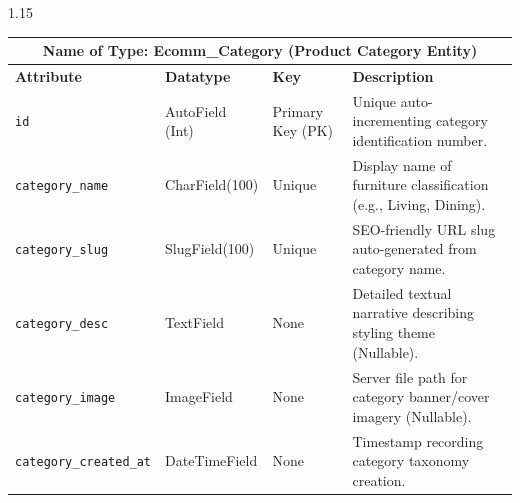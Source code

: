 \documentclass[12pt,a4paper]{article}
\begin{document}
{\begin{spacing}{1.15}
\begin{center}
\renewcommand{\arraystretch}{1.15}
\fontsize{9}{12}\selectfont
\begin{tabular}{|p{1.4in}|p{1.1in}|p{0.8in}|p{2.9in}|}
\hline
\multicolumn{4}{|c|}{\textbf{\fontsize{10}{13}\selectfont Name of Type: Ecomm\_Category (Product Category Entity)}} \\ \hline
\textbf{Attribute} & \textbf{Datatype} & \textbf{Key} & \textbf{Description} \\ \hline
\texttt{id} & AutoField (Int) & Primary Key (PK) & Unique auto-incrementing category identification number. \\ \hline
\texttt{category\_name} & CharField(100) & Unique & Display name of furniture classification (e.g., Living, Dining). \\ \hline
\texttt{category\_slug} & SlugField(100) & Unique & SEO-friendly URL slug auto-generated from category name. \\ \hline
\texttt{category\_desc} & TextField & None & Detailed textual narrative describing styling theme (Nullable). \\ \hline
\texttt{category\_image} & ImageField & None & Server file path for category banner/cover imagery (Nullable). \\ \hline
\texttt{category\_created\_at} & DateTimeField & None & Timestamp recording category taxonomy creation. \\ \hline
\end{tabular}
\end{center}

\vspace{0.08in}


\end{spacing}}
\end{document}
